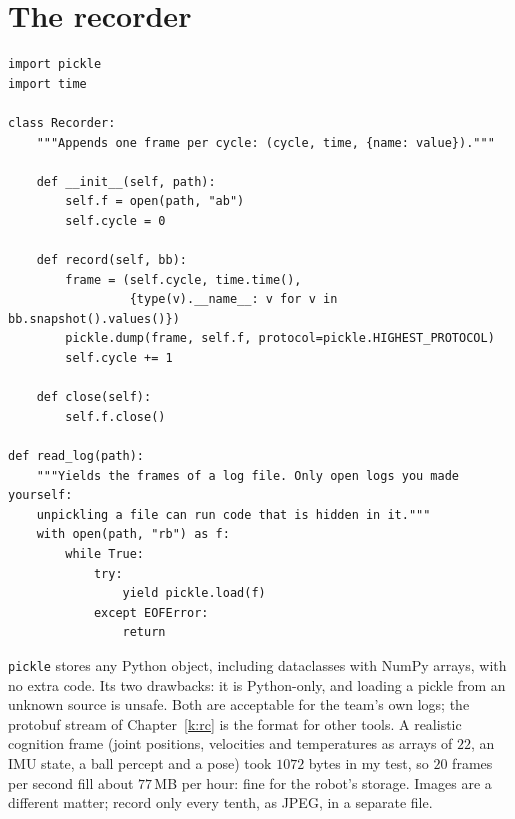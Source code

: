 \section*{The recorder}
\begin{verbatim}
import pickle
import time

class Recorder:
    """Appends one frame per cycle: (cycle, time, {name: value})."""

    def __init__(self, path):
        self.f = open(path, "ab")
        self.cycle = 0

    def record(self, bb):
        frame = (self.cycle, time.time(),
                 {type(v).__name__: v for v in bb.snapshot().values()})
        pickle.dump(frame, self.f, protocol=pickle.HIGHEST_PROTOCOL)
        self.cycle += 1

    def close(self):
        self.f.close()

def read_log(path):
    """Yields the frames of a log file. Only open logs you made yourself:
    unpickling a file can run code that is hidden in it."""
    with open(path, "rb") as f:
        while True:
            try:
                yield pickle.load(f)
            except EOFError:
                return
\end{verbatim}
\texttt{pickle} stores any Python object, including dataclasses with NumPy arrays, with no extra code. Its two drawbacks: it is Python-only, and loading a pickle from an unknown source is unsafe. Both are acceptable for the team's own logs; the protobuf stream of Chapter~\ref{k:rc} is the format for other tools. A realistic cognition frame (joint positions, velocities and temperatures as arrays of $22$, an IMU state, a ball percept and a pose) took $1072$ bytes in my test, so $20$ frames per second fill about $77$\,MB per hour: fine for the robot's storage. Images are a different matter; record only every tenth, as JPEG, in a separate file.

